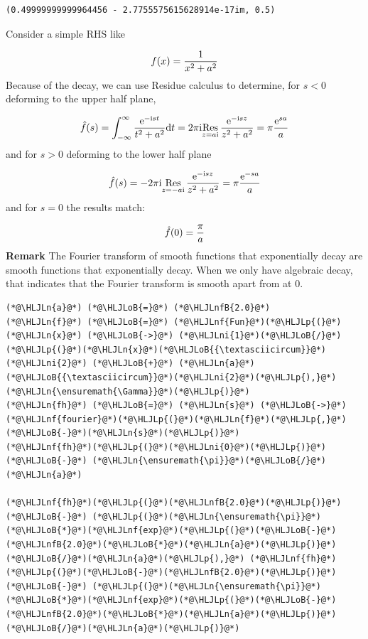 \documentclass[12pt,a4paper]{article}
\newcommand{\HLJLn}[1]{#1}
\newcommand{\HLJLnf}[1]{\textcolor[RGB]{66,102,213}{#1}}
\newcommand{\HLJLnfB}[1]{\textcolor[RGB]{59,151,46}{#1}}
\newcommand{\HLJLni}[1]{\textcolor[RGB]{59,151,46}{#1}}
\newcommand{\HLJLoB}[1]{\textcolor[RGB]{102,102,102}{\textbf{#1}}}
\newcommand{\HLJLp}[1]{#1}
\def\D{ {\rm d} }
\def\I{ {\rm i} }
\def\E{ {\rm e} }
\def\Res_#1{\underset{#1}{\rm Res}\,}
\def\dt{\D t}
\begin{document}
\begin{lstlisting}
(0.49999999999964456 - 2.7755575615628914e-17im, 0.5)
\end{lstlisting}


Consider a simple RHS like

\[
f(x) = {1 \over x^2 + a^2}
\]
Because of the decay, we can use Residue calculus to determine, for $s < 0$ deforming to the upper half plane,

\[
\hat f(s) = \int_{-\infty}^\infty {\E^{-\I s t} \over t^2 + a^2}\dt = 2 \pi \I \Res_{z = a \I}{\E^{-\I s z} \over z^2 + a^2} = \pi  {\E^{s a} \over a}
\]
and for $s > 0$ deforming to the lower half plane

\[
\hat f(s) =-2 \pi \I \Res_{z =- a \I}{\E^{-\I s z} \over z^2 + a^2} = \pi {\E^{-s a} \over  a}
\]
and for $s = 0$ the results match:

\[
\hat f(0) = {\pi  \over  a}
\]
\textbf{Remark} The Fourier transform of smooth functions that exponentially  decay are smooth functions that exponentially decay. When we only have algebraic decay,  that indicates that the Fourier transform is smooth apart from at $0$. 


\begin{lstlisting}
(*@\HLJLn{a}@*) (*@\HLJLoB{=}@*) (*@\HLJLnfB{2.0}@*)
(*@\HLJLn{f}@*) (*@\HLJLoB{=}@*) (*@\HLJLnf{Fun}@*)(*@\HLJLp{(}@*)(*@\HLJLn{x}@*) (*@\HLJLoB{->}@*) (*@\HLJLni{1}@*)(*@\HLJLoB{/}@*)(*@\HLJLp{(}@*)(*@\HLJLn{x}@*)(*@\HLJLoB{{\textasciicircum}}@*)(*@\HLJLni{2}@*) (*@\HLJLoB{+}@*) (*@\HLJLn{a}@*)(*@\HLJLoB{{\textasciicircum}}@*)(*@\HLJLni{2}@*)(*@\HLJLp{),}@*) (*@\HLJLn{\ensuremath{\Gamma}}@*)(*@\HLJLp{)}@*)
(*@\HLJLn{fh}@*) (*@\HLJLoB{=}@*) (*@\HLJLn{s}@*) (*@\HLJLoB{->}@*) (*@\HLJLnf{fourier}@*)(*@\HLJLp{(}@*)(*@\HLJLn{f}@*)(*@\HLJLp{,}@*) (*@\HLJLoB{-}@*)(*@\HLJLn{s}@*)(*@\HLJLp{)}@*)
(*@\HLJLnf{fh}@*)(*@\HLJLp{(}@*)(*@\HLJLni{0}@*)(*@\HLJLp{)}@*) (*@\HLJLoB{-}@*) (*@\HLJLn{\ensuremath{\pi}}@*)(*@\HLJLoB{/}@*)(*@\HLJLn{a}@*)

(*@\HLJLnf{fh}@*)(*@\HLJLp{(}@*)(*@\HLJLnfB{2.0}@*)(*@\HLJLp{)}@*) (*@\HLJLoB{-}@*) (*@\HLJLp{(}@*)(*@\HLJLn{\ensuremath{\pi}}@*)(*@\HLJLoB{*}@*)(*@\HLJLnf{exp}@*)(*@\HLJLp{(}@*)(*@\HLJLoB{-}@*)(*@\HLJLnfB{2.0}@*)(*@\HLJLoB{*}@*)(*@\HLJLn{a}@*)(*@\HLJLp{)}@*)(*@\HLJLoB{/}@*)(*@\HLJLn{a}@*)(*@\HLJLp{),}@*) (*@\HLJLnf{fh}@*)(*@\HLJLp{(}@*)(*@\HLJLoB{-}@*)(*@\HLJLnfB{2.0}@*)(*@\HLJLp{)}@*) (*@\HLJLoB{-}@*) (*@\HLJLp{(}@*)(*@\HLJLn{\ensuremath{\pi}}@*)(*@\HLJLoB{*}@*)(*@\HLJLnf{exp}@*)(*@\HLJLp{(}@*)(*@\HLJLoB{-}@*)(*@\HLJLnfB{2.0}@*)(*@\HLJLoB{*}@*)(*@\HLJLn{a}@*)(*@\HLJLp{)}@*)(*@\HLJLoB{/}@*)(*@\HLJLn{a}@*)(*@\HLJLp{)}@*)
\end{lstlisting}
\end{document}
